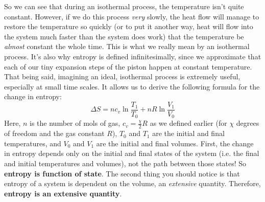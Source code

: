 \newline\newline
So we can see that during an isothermal process, the temperature isn't quite constant. However, if we do this process \textit{very} slowly, the heat flow will manage to restore the temperature so quickly (or to put it another way, heat will flow into the system much faster than the system does work) that the temperature be \textit{almost} constant the whole time. This is what we really mean by an isothermal process. It's also why entropy is defined infinitesimally, since we approximate that each of our tiny expansion steps of the piston happen at constant temperature.
\newline\newline
That being said, imagining an ideal, isothermal process is extremely useful, especially at small time scales. It allows us to derive the following formula for the change in entropy:
\begin{equation}
    \label{eqn:(36)}
    \Delta S=n{c_{v}}\ln{\frac{T_1}{T_0}} + nR\ln{\frac{V_1}{V_0}}
\end{equation}
Here, $n$ is the number of mols of gas, $c_v = \frac{\chi}{2}R$ as we defined earlier (for $\chi$ degrees of freedom and the gas constant $R$), $T_0$ and $T_1$ are the initial and final temperatures, and $V_0$ and $V_1$ are the initial and final volumes. First, the change in entropy depends only on the initial and final states of the system (i.e. the final and initial temperatures and volumes), not the path between those states! So \textbf{entropy is function of state}.
\newline\newline
The second thing you should notice is that entropy of a system is dependent on the volume, an \textit{extensive} quantity. Therefore, \textbf{entropy is an extensive quantity}.


